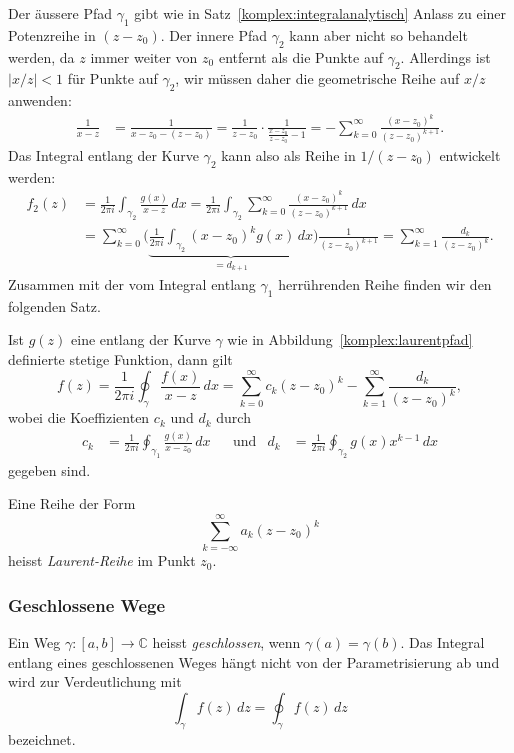 Der äussere Pfad $\gamma_1$ gibt wie in Satz~\ref{komplex:integralanalytisch}
Anlass zu einer Potenzreihe in $(z-z_0)$.
Der innere Pfad $\gamma_2$ kann aber nicht so behandelt werden, da $z$ immer
weiter von $z_0$ entfernt als die Punkte auf $\gamma_2$.
Allerdings ist $|x/z| < 1$ für Punkte auf $\gamma_2$, wir müssen daher
die geometrische Reihe auf $x/z$ anwenden:
\begin{align*}
\frac{1}{x-z}
&=
\frac{1}{x-z_0-(z-z_0)}
=
\frac{1}{z-z_0}
\cdot
\frac{1}{\displaystyle\frac{x-z_0}{z-z_0}-1}
=
-\sum_{k=0}^\infty \frac{(x-z_0)^k}{(z-z_0)^{k+1}}.
\end{align*}
Das Integral entlang der Kurve $\gamma_2$ kann also als Reihe in $1/(z-z_0)$
entwickelt werden:
\begin{align*}
f_2(z)
&=
\frac{1}{2\pi i}\int_{\gamma_2} \frac{g(x)}{x-z}\,dx
=
\frac{1}{2\pi i}\int_{\gamma_2}\sum_{k=0}^\infty
\frac{(x-z_0)^k}{(z-z_0)^{k+1}}\,dx
\\
&=
\sum_{k=0}^\infty
\biggl(
\underbrace{\frac1{2\pi i}\int_{\gamma_2} (x-z_0)^kg(x)\,dx
}_{\displaystyle =d_{k+1}}
\biggr)
\frac1{(z-z_0)^{k+1}}
=\sum_{k=1}^\infty \frac{d_k}{(z-z_0)^k}.
\end{align*}
Zusammen mit der vom Integral entlang $\gamma_1$ herrührenden Reihe finden
wir den folgenden Satz.
\begin{satz}
\label{komplex:laurentreihe}
Ist $g(z)$ eine entlang der Kurve $\gamma$ wie in
Abbildung~\ref{komplex:laurentpfad} definierte stetige Funktion, dann gilt
\[
f(z)=\frac1{2\pi i}\oint_{\gamma} \frac{f(x)}{x-z}\,dx
=
\sum_{k=0}^{\infty} c_k(z-z_0)^k-\sum_{k=1}^\infty \frac{d_k}{(z-z_0)^k},
\]
wobei die Koeffizienten $c_k$ und $d_k$ durch
\[
\begin{aligned}
c_k&=\frac1{2\pi i}\oint_{\gamma_1} \frac{g(x)}{x-z_0}\,dx
&&
\text{und}
&
d_k&=\frac1{2\pi i}\oint_{\gamma_2} g(x)x^{k-1}\,dx
\end{aligned}
\]
gegeben sind.
\end{satz}

\begin{definition}
Eine Reihe der Form
\[
\sum_{k=-\infty}^\infty a_k(z-z_0)^k
\]
heisst {\em Laurent-Reihe }
im Punkt $z_0$.
\end{definition}


%
%
\subsubsection{Geschlossene Wege}
\begin{definition}
Ein Weg $\gamma\colon[a,b]\to\mathbb C$ heisst {\em geschlossen}, wenn
$\gamma(a)=\gamma(b)$.
Das Integral entlang eines geschlossenen Weges hängt nicht von der
Parametrisierung ab und wird zur Verdeutlichung mit
\[
\int_{\gamma}f(z)\,dz
=
\oint_{\gamma}f(z)\,dz
\]
bezeichnet.
\end{definition}

